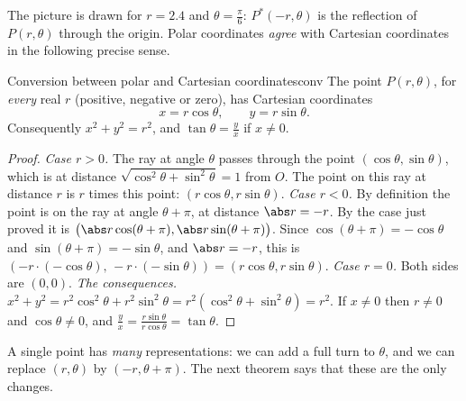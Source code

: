 \documentclass[11pt]{article}
\begin{document}
The picture is drawn for $r=2.4$ and $\theta=\frac\pi6$: $P^*(-r,\theta)$ is the reflection of $P(r,\theta)$ through the origin. Polar coordinates \emph{agree} with Cartesian coordinates in the following precise sense.

\begin{thm}{Conversion between polar and Cartesian coordinates}{conv}
The point $P(r,\theta)$, for \emph{every} real $r$ (positive, negative or zero), has Cartesian coordinates
\[
x=r\cos\theta,\qquad y=r\sin\theta.
\]
Consequently $x^2+y^2=r^2$, and $\tan\theta=\frac yx$ if $x\ne0$.
\end{thm}
\begin{proof}
\emph{Case $r>0$.} The ray at angle $\theta$ passes through the point $(\cos\theta,\sin\theta)$, which is at distance $\sqrt{\cos^2\theta+\sin^2\theta}=1$ from $O$. The point on this ray at distance $r$ is $r$ times this point: $(r\cos\theta,r\sin\theta)$.
\emph{Case $r<0$.} By definition the point is on the ray at angle $\theta+\pi$, at distance $\abs r=-r$. By the case just proved it is $\bigl(\abs r\cos(\theta+\pi),\abs r\sin(\theta+\pi)\bigr)$. Since $\cos(\theta+\pi)=-\cos\theta$ and $\sin(\theta+\pi)=-\sin\theta$, and $\abs r=-r$, this is $(-r\cdot(-\cos\theta),\,-r\cdot(-\sin\theta))=(r\cos\theta,r\sin\theta)$.
\emph{Case $r=0$.} Both sides are $(0,0)$.
\emph{The consequences.} $x^2+y^2=r^2\cos^2\theta+r^2\sin^2\theta=r^2(\cos^2\theta+\sin^2\theta)=r^2$. If $x\ne0$ then $r\ne0$ and $\cos\theta\ne0$, and $\frac yx=\frac{r\sin\theta}{r\cos\theta}=\tan\theta$.
\end{proof}

A single point has \emph{many} representations: we can add a full turn to $\theta$, and we can replace $(r,\theta)$ by $(-r,\theta+\pi)$. The next theorem says that these are the only changes.
\end{document}
